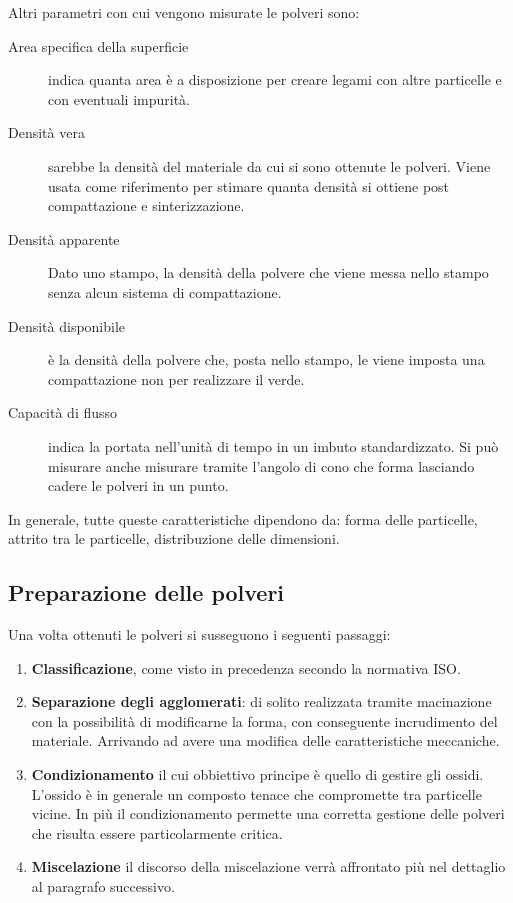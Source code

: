 Altri parametri con cui vengono misurate le polveri sono:
\begin{description}
\item[Area specifica della superficie] indica quanta area è a disposizione per creare legami con altre particelle e con eventuali impurità.
\item[Densità vera] sarebbe la densità del materiale da cui si sono ottenute le polveri.
Viene usata come riferimento per stimare quanta densità si ottiene post compattazione e sinterizzazione.
\item[Densità apparente] Dato uno stampo, la densità della polvere che viene messa nello stampo senza alcun sistema di compattazione.
\item[Densità disponibile] è la densità della polvere che, posta nello stampo, le viene imposta una compattazione non per realizzare il verde.
\item[Capacità di flusso] indica la portata nell'unità di tempo in un imbuto standardizzato.
Si può misurare anche misurare tramite l'angolo di cono che forma lasciando cadere le polveri in un punto.
\end{description}

In generale, tutte queste caratteristiche dipendono da: forma delle particelle, attrito tra le particelle, distribuzione delle dimensioni.

\subsection{Preparazione delle polveri}
Una volta ottenuti le polveri si susseguono i seguenti passaggi:
\begin{enumerate}
\item \textbf{Classificazione}, come visto in precedenza secondo la normativa ISO.
\item \textbf{Separazione degli agglomerati}: di solito realizzata tramite macinazione con la possibilità di modificarne la forma, con conseguente incrudimento del materiale. Arrivando ad avere una modifica delle caratteristiche meccaniche.
\item \textbf{Condizionamento} il cui obbiettivo principe è quello di gestire gli ossidi.
L'ossido è in generale un composto tenace che compromette tra particelle vicine.
In più il condizionamento permette una corretta gestione delle polveri che risulta essere particolarmente critica.
\item \textbf{Miscelazione} il discorso della miscelazione verrà affrontato più nel dettaglio al paragrafo successivo.
\end{enumerate}

